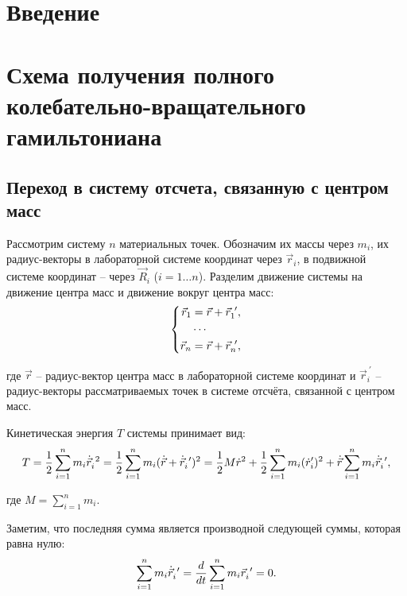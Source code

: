 \section{Введение}

\section{Схема получения полного колебательно-вращательного гамильтониана}
\subsection{Переход в систему отсчета, связанную с центром масс}

\hspace{0.35cm} Рассмотрим систему $n$ материальных точек. Обозначим их массы через $m_i$, их радиус-векторы в лабораторной системе координат через $\vec{r}_i$, в подвижной системе координат -- через $\vec{R}_i$ ($i = 1 \dots n$). Разделим движение системы на движение центра масс и движение вокруг центра масс:
\vspace*{-0.1cm}
\begin{gather}
\left\{
\begin{aligned}
\vec{r}_1 &= \vec{r} + \vec{r}_1^{\ \prime}, \\
&\cdots \\
\vec{r}_n &= \vec{r} + \vec{r}_n^{\ \prime},
\end{aligned}
\right. \notag
\end{gather}

\hspace*{-0.75cm} где $\vec{r}$ -- радиус-вектор центра масс в лабораторной системе координат и $\vec{r}_i^{\ \prime}$ -- радиус-векторы рассматриваемых точек в системе отсчёта, связанной с центром масс.

Кинетическая энергия $T$ системы принимает вид: 
\vspace*{-0.1cm}
\begin{gather}
T = \frac{1}{2} \sum_{i=1}^{n} m_i \dot{\vec{r}}_i^{\ 2} = \frac{1}{2} \sum_{i=1}^{n} m_i (\dot{\vec{r}} + \dot{\vec{r}}_i^{\ \prime})^2  = \frac{1}{2} M \dot{r}^2 + \frac{1}{2} \sum_{i=1}^{n} m_i ( \dot{r}_i^\prime)^2 + \dot{\vec{r}} \sum_{i=1}^{n} m_i \dot{\vec{r}}_i^{\ \prime}, \notag
\end{gather}

\hspace*{-0.75cm} где $M = \sum_{i=1}^{n} m_i$.

Заметим, что последняя сумма является производной следующей суммы, которая равна нулю: 
\vspace*{-0.1cm}
\begin{gather}
\sum_{i=1}^{n} m_i \dot{\vec{r}}_i^{\ \prime} = \frac{d}{dt} \sum_{i=1}^{n} m_i \vec{r}_i^{\ \prime} = 0. \notag
\end{gather}

